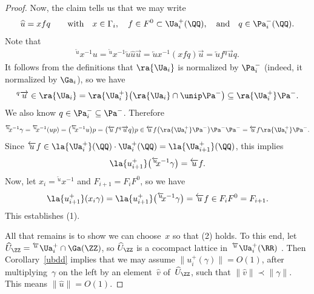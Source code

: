 \begin{proof}
Now, the claim tells us that we may write
	\[ \widehat{u} = x f q \qquad \text{with} \quad x \in \Gamma_i, \quad f \in F^0 \subset \Ua^+_i(\QQ), \quad \text{and} \quad q \in \Pa_i^-(\QQ) .\]
Note that
	\begin{gather*}
	 {}^{\overleftarrow{u}} \! \! x^{-1} u
	 = {}^{\overleftarrow{u}} \! \! x^{-1} \overleftarrow{u} \widehat{u} \overrightarrow{u}
	= \overleftarrow{u} x^{-1} (x f q) \overrightarrow{u}
	= \overleftarrow{u} f {}^q \overrightarrow{u} q
	. \end{gather*}
It follows from the definitions that $\ra{\Ua_i}$ is normalized by $\Pa_i^-$ (indeed, it normalized by $\Ga_i$), so we have
	\begin{gather} \label{quplus}
	{}^q \overrightarrow{u}
	\in \ra{\Ua_i}
	= \ra{\Ua_i^+} \big(\ra{\Ua_i} \cap \unip \Pa^-\big)
	\subseteq \ra{\Ua_i^+} \Pa^-
	. \end{gather}
We also know $q \in \Pa_i^- \subseteq \Pa^-$. Therefore
	\begin{gather} \label{usgamma}
	{}^{\overleftarrow{u}} \! \! x^{-1} \gamma
	= {}^{\overleftarrow{u}} \! \! x^{-1} (u p)
	= \big({}^{\overleftarrow{u}} \! \! x^{-1} u\big) p
	= \big(\overleftarrow{u} f {}^q \overrightarrow{u} q\big) p
	\in \overleftarrow{u} f \big(\ra{\Ua_i^+} \Pa^-\big) \Pa^- \Pa^-
	= \overleftarrow{u} f \ra{\Ua_i^+} \Pa^-
	. \end{gather}
Since $\overleftarrow{u} f \in \la{\Ua^+_i}(\QQ) \cdot \Ua^+_i(\QQ) = \la{\Ua^+_{i+1}}(\QQ)$, this implies
	\[ \la{u^+_{i+1}} \big( {}^{\overleftarrow{u}} \! \! x^{-1} \gamma\big) = \overleftarrow{u} f .\]
Now, let $x_i = {}^{\overleftarrow{u}} \! \! x^{-1}$ and $F_{i+1} = F_i F^0$, so we have
	\begin{gather*}
	\la{u^+_{i+1}} ( x_i \gamma)
	= \la{u^+_{i+1}} \big( {}^{\overleftarrow{u}} \! \! x^{-1} \gamma\big)
	= \overleftarrow{u} f
	\in F_i F^0
	= F_{i+1}
	. \end{gather*}
This establishes (1).

All that remains is to show we can choose~$x$ so that (2) holds.
To this end, let $\widehat{U}_\ZZ = {}^{\overleftarrow{u}}\Ua^+_i \cap \Ga(\ZZ)$, so $\widehat{U}_\ZZ$ is a cocompact lattice in~${}^{\overleftarrow{u}}\Ua^+_i(\RR)$ \cite[Theorem~4.12, p.~210]{MR1278263}. Then Corollary~\ref{ubdd} implies that we may assume
	$\| u^+_i(\gamma) \| = O(1) $,
after multiplying~$\gamma$ on the left by an element~$\widehat{v}$ of~$\widehat{U}_\ZZ$, such that $\| \widehat{v} \| \prec \| \gamma \|$. This means $\| \widehat u \| = O(1)$.


\end{proof}
